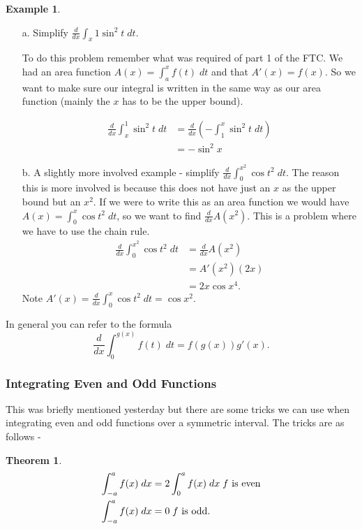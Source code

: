 \documentclass[12pt,reqno]{article}
\newtheorem{Theorem}{Theorem}
\theoremstyle{definition}
\newtheorem*{Example}{Example}
\begin{document}
\begin{Example}
	\begin{enumerate}
		\item[a.] Simplify $\frac{d}{dx} \int_{x}{1} \sin^2 t \; dt$. 
		
		To do this problem remember what was required of part 1 of the FTC. We had an area function $A(x) = \int_{a}^{x} f(t) \; dt$ and that $A'(x) = f(x)$. So we want to make sure our integral is written in the same way as our area function (mainly the $x$ has to be the upper bound). 
		
		\begin{align*}
			\frac{d}{dx}\int_{x}^{1} \sin^2 t \; dt &= \frac{d}{dx} \left(- \int_{1}^{x} \sin^2 t \; dt \right)\\
			&= - \sin^2 x 
		\end{align*}
	
		\item[b.] A slightly more involved example - simplify $\frac{d}{dx} \int_{0}^{x^2} \cos t^2 \; dt$. The reason this is more involved is because this does not have just an $x$ as the upper bound but an $x^2$. If we were to write this as an area function we would have $A(x) = \int_{0}^{x} \cos t^2 \; dt$, so we want to find $\frac{d}{dx} A(x^2)$. This is a problem where we have to use the chain rule. 
		\begin{align*}
			\frac{d}{dx} \int_{0}^{x^2} \cos t^2 \; dt &= \frac{d}{dx} A(x^2) \\
			&= A'(x^2) (2x) \\
			&= 2x \cos x^4.
		\end{align*}
		Note $A'(x) = \frac{d}{dx} \int_{0}^{x} \cos t^2 \; dt = \cos x^2$. 
	\end{enumerate}

	In general you can refer to the formula $$\frac{d}{dx} \int_{0}^{g(x)} f(t) \; dt = f(g(x)) g'(x).$$ 
\end{Example}


\subsubsection{Integrating Even and Odd Functions} 

This was briefly mentioned yesterday but there are some tricks we can use when integrating even and odd functions over a symmetric interval. The tricks are as follows - 
\begin{Theorem}
	\begin{align*}
		\int_{-a}^{a} f(x) \; dx &= 2 \int_{0}^{a} f(x) \; dx \; f\textnormal{ is even} \\
		\int_{-a}^{a} f(x) \; dx &= 0 \; f\textnormal{ is odd.}
	\end{align*}
\end{Theorem}
\end{document}
